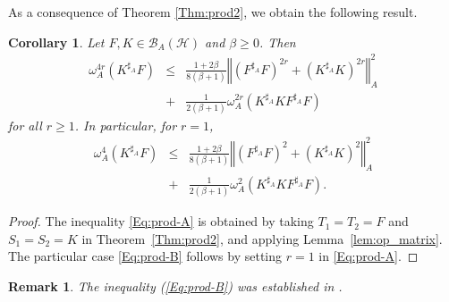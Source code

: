 \documentclass{article}
\newcommand{\bra}[1]{\left(#1\right)}
\newcommand{\normA}[1]{{\left\Vert#1\right\Vert}_{A}}
\newcommand {\h}{\mathcal{H}}
\renewcommand {\b}{\mathcal{B}}
\newtheorem{corollary}[theorem]{Corollary}
\newtheorem{remark}[theorem]{Remark}
\begin{document}
  As a consequence of Theorem \ref{Thm:prod2}, we obtain the following result.
   \begin{corollary}\label{Cor:prod-A} Let $F,K\in\b_A(\h)$ and $\beta\geq 0$. Then
 \begin{eqnarray}\label{Eq:prod-A}
   \omega_A^{4r}\bra{K^{\sharp_A}F} &\leq& \frac{1+2\beta}{8(\beta+1)}\normA{\bra{F^{\sharp_A}F}^{2r}+\bra{K^{\sharp_A}K}^{2r}}^2\\
    &+& \frac{1}{2(\beta+1)}\omega_A^{2r}\bra{K^{\sharp_A}KF^{\sharp_A}F}\nonumber
 \end{eqnarray}
 for all $r\geq 1$. In particular, for $r=1$,
 \begin{eqnarray}\label{Eq:prod-B}
   \omega_A^{4}\bra{K^{\sharp_A}F} &\leq& \frac{1+2\beta}{8(\beta+1)}\normA{\bra{F^{\sharp_A}F}^{2}+\bra{K^{\sharp_A}K}^{2}}^2\\
    &+& \frac{1}{2(\beta+1)}\omega_A^{2}\bra{K^{\sharp_A}KF^{\sharp_A}F}.\nonumber
 \end{eqnarray}
 \end{corollary}
 \begin{proof} The inequality \eqref{Eq:prod-A} is obtained by taking $T_1 = T_2 = F$ and $S_1 = S_2 = K$ in Theorem~\ref{Thm:prod2}, and applying Lemma~\ref{lem:op_matrix}. The particular case \eqref{Eq:prod-B} follows by setting $r = 1$ in \eqref{Eq:prod-A}.
 \end{proof}
 \begin{remark} The inequality (\ref{Eq:prod-B}) was established in \cite[Theorem 3.4]{QHC}.
 \end{remark}
\end{document}
